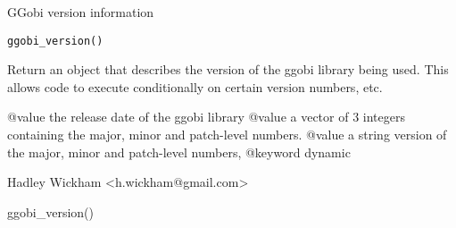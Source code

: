 \begin{Description}\relax
GGobi version information
\end{Description}
\begin{Usage}
\begin{verbatim}ggobi_version()\end{verbatim}
\end{Usage}
\begin{Arguments}
\end{Arguments}
\begin{Details}\relax
Return an object that describes the version of the ggobi
library being used. This allows code to execute
conditionally on certain version numbers, etc.

@value the release date of the ggobi library
@value a vector of 3 integers containing the major, minor and patch-level numbers.
@value a string version of the major, minor and patch-level numbers,
@keyword dynamic
\end{Details}
\begin{Value}
\begin{ldescription}
\item[\code{the release date of the ggobi library}] 
\item[\code{a vector of 3 integers containing the major, minor and patch-level numbers.}] 
\item[\code{a string version of the major, minor and patch-level numbers,}] 
\end{ldescription}
\end{Value}
\begin{Author}\relax
Hadley Wickham <h.wickham@gmail.com>
\end{Author}
\begin{Examples}
\begin{ExampleCode}ggobi_version()\end{ExampleCode}
\end{Examples}

